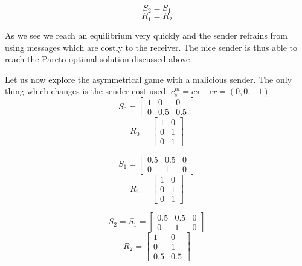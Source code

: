 \documentclass[10]{article}
\begin{document}
\begin{equation*}
S_2=S_1
\end{equation*}
\begin{equation*}
R_1=R_2
\end{equation*}

As we see we reach an equilibrium very quickly and the sender refrains from using messages which are costly to the receiver. The nice sender is thus able to reach the Pareto optimal solution discussed above.

Let us now explore the asymmetrical game with a malicious sender. The only thing which changes is the sender cost used: $c_s^m=cs - cr=(0,0,-1)$
\begin{equation*}
S_0=
\begin{bmatrix}
1 & 0 & 0\\
0 & 0.5 & 0.5
\end{bmatrix}
\end{equation*}
\begin{equation*}
R_0=
\begin{bmatrix}
1 & 0\\
0 & 1\\
0 & 1
\end{bmatrix}
\end{equation*}

\begin{equation*}
S_1=
\begin{bmatrix}
0.5 & 0.5 & 0\\
0 & 1 & 0
\end{bmatrix}
\end{equation*}
\begin{equation*}
R_1=
\begin{bmatrix}
1 & 0\\
0 & 1\\
0 & 1
\end{bmatrix}
\end{equation*}

\begin{equation*}
S_2=S_1=
\begin{bmatrix}
0.5 & 0.5 & 0\\
0 & 1 & 0
\end{bmatrix}
\end{equation*}
\begin{equation*}
R_2=
\begin{bmatrix}
1 & 0\\
0 & 1\\
0.5 & 0.5
\end{bmatrix}
\end{equation*}
\end{document}
